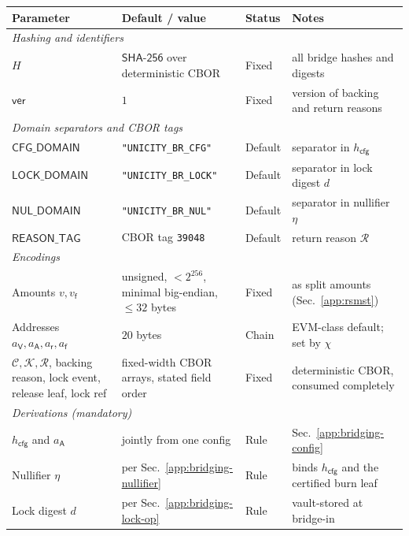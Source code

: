\begin{longtable}{p{3.0cm}p{4.2cm}p{2.0cm}p{3.4cm}}
\textbf{Parameter} & \textbf{Default / value} & \textbf{Status} & \textbf{Notes} \\
\hline
\endhead
\multicolumn{4}{l}{\textit{Hashing and identifiers}}\\
\hline
$H$ & $\mathsf{SHA\text{-}256}$ over deterministic CBOR & Fixed & all bridge hashes and digests \\
$\mathsf{ver}$ & $1$ & Fixed & version of backing and return reasons \\
\hline
\multicolumn{4}{l}{\textit{Domain separators and CBOR tags}}\\
\hline
$\mathsf{CFG\_DOMAIN}$    & \texttt{"UNICITY\_BR\_CFG"}  & Default & separator in $h_\mathsf{cfg}$ \\
$\mathsf{LOCK\_DOMAIN}$   & \texttt{"UNICITY\_BR\_LOCK"} & Default & separator in lock digest $d$ \\
$\mathsf{NUL\_DOMAIN}$    & \texttt{"UNICITY\_BR\_NUL"}  & Default & separator in nullifier $\eta$ \\
$\mathsf{REASON\_TAG}$    & CBOR tag \texttt{39048}        & Default & return reason $\mathcal{R}$ \\
\hline
\multicolumn{4}{l}{\textit{Encodings}}\\
\hline
Amounts $v,v_\mathsf{f}$ & unsigned, $<2^{256}$, minimal big-endian, $\le 32$ bytes & Fixed & as split amounts (Sec.~\ref{app:rsmst}) \\
Addresses $a_\mathsf{V},a_\mathsf{A},a_\mathsf{r},a_\mathsf{f}$ & $20$ bytes & Chain & EVM-class default; set by $\chi$ \\
$\mathcal{C},\mathcal{K},\mathcal{R}$, backing reason, lock event, release leaf, lock ref & fixed-width CBOR arrays, stated field order & Fixed & deterministic CBOR, consumed completely \\
\hline
\multicolumn{4}{l}{\textit{Derivations (mandatory)}}\\
\hline
$h_\mathsf{cfg}$ and $a_\mathsf{A}$ & jointly from one config & Rule & Sec.~\ref{app:bridging-config} \\
Nullifier $\eta$ & per Sec.~\ref{app:bridging-nullifier} & Rule & binds $h_\mathsf{cfg}$ and the certified burn leaf \\
Lock digest $d$ & per Sec.~\ref{app:bridging-lock-op} & Rule & vault-stored at bridge-in \\

\end{longtable}
